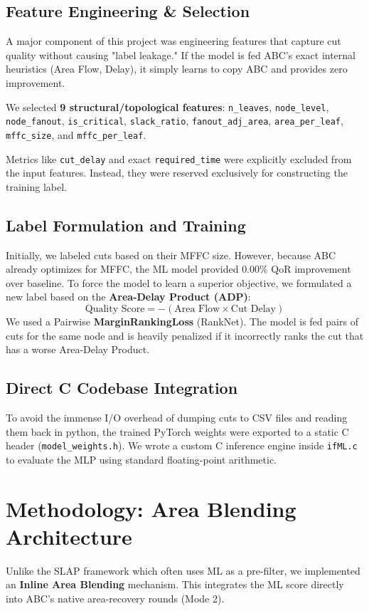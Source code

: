 \documentclass[11pt,a4paper]{article}
\begin{document}
\subsection{Feature Engineering \& Selection}
A major component of this project was engineering features that capture cut quality without causing "label leakage." If the model is fed ABC's exact internal heuristics (Area Flow, Delay), it simply learns to copy ABC and provides zero improvement. 

We selected \textbf{9 structural/topological features}:
\texttt{n\_leaves}, \texttt{node\_level}, \texttt{node\_fanout}, \texttt{is\_critical}, \texttt{slack\_ratio}, \texttt{fanout\_adj\_area}, \texttt{area\_per\_leaf}, \texttt{mffc\_size}, and \texttt{mffc\_per\_leaf}. 

Metrics like \texttt{cut\_delay} and exact \texttt{required\_time} were explicitly excluded from the input features. Instead, they were reserved exclusively for constructing the training label.

\subsection{Label Formulation and Training}
Initially, we labeled cuts based on their MFFC size. However, because ABC already optimizes for MFFC, the ML model provided $0.00\%$ QoR improvement over baseline. To force the model to learn a superior objective, we formulated a new label based on the \textbf{Area-Delay Product (ADP)}:
\[ \text{Quality Score} = -(\text{Area Flow} \times \text{Cut Delay}) \]
We used a Pairwise \textbf{MarginRankingLoss} (RankNet). The model is fed pairs of cuts for the same node and is heavily penalized if it incorrectly ranks the cut that has a worse Area-Delay Product.

\subsection{Direct C Codebase Integration}
To avoid the immense I/O overhead of dumping cuts to CSV files and reading them back in python, the trained PyTorch weights were exported to a static C header (\texttt{model\_weights.h}). We wrote a custom C inference engine inside \texttt{ifML.c} to evaluate the MLP using standard floating-point arithmetic. 

\section{Methodology: Area Blending Architecture}
Unlike the SLAP framework which often uses ML as a pre-filter, we implemented an \textbf{Inline Area Blending} mechanism. This integrates the ML score directly into ABC's native area-recovery rounds (Mode 2). 
\end{document}

